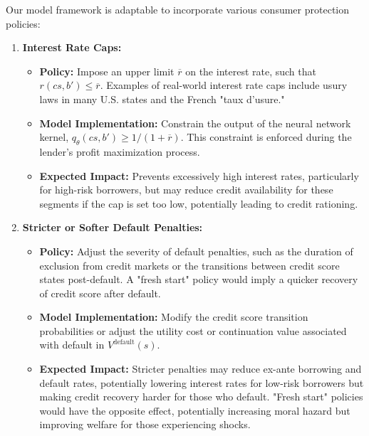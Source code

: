 \documentclass[acmsmall]{acmart}
\begin{document}
Our model framework is adaptable to incorporate various consumer protection policies:

\begin{enumerate}
    \item \textbf{Interest Rate Caps:}
    \begin{itemize}
        \item \textbf{Policy:} Impose an upper limit $\overline{r}$ on the interest rate, such that $r(cs,b') \leq \overline{r}$. Examples of real-world interest rate caps include usury laws in many U.S. states and the French "taux d’usure."
        \item \textbf{Model Implementation:} Constrain the output of the neural network kernel, $q_\theta(cs,b') \geq 1/(1 + \overline{r})$. This constraint is enforced during the lender's profit maximization process.
        \item \textbf{Expected Impact:} Prevents excessively high interest rates, particularly for high-risk borrowers, but may reduce credit availability for these segments if the cap is set too low, potentially leading to credit rationing.
    \end{itemize}

    \item \textbf{Stricter or Softer Default Penalties:}
    \begin{itemize}
        \item \textbf{Policy:} Adjust the severity of default penalties, such as the duration of exclusion from credit markets or the transitions between credit score states post-default. A "fresh start" policy would imply a quicker recovery of credit score after default.
        \item \textbf{Model Implementation:} Modify the credit score transition probabilities or adjust the utility cost or continuation value associated with default in $V^\text{default}(s)$.
        \item \textbf{Expected Impact:} Stricter penalties may reduce ex-ante borrowing and default rates, potentially lowering interest rates for low-risk borrowers but making credit recovery harder for those who default. "Fresh start" policies would have the opposite effect, potentially increasing moral hazard but improving welfare for those experiencing shocks.
    \end{itemize}


\end{enumerate}
\end{document}
